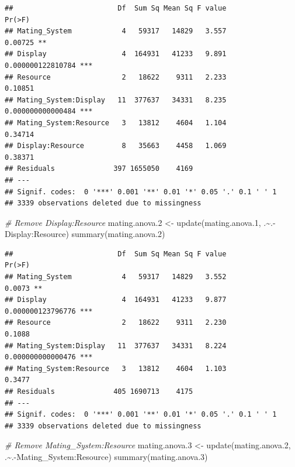 \documentclass[
  12pt,
]{article}
\newenvironment{Shaded}{\begin{snugshade}}{\end{snugshade}}
\newcommand{\CommentTok}[1]{\textcolor[rgb]{0.56,0.35,0.01}{\textit{#1}}}
\newcommand{\FloatTok}[1]{\textcolor[rgb]{0.00,0.00,0.81}{#1}}
\newcommand{\FunctionTok}[1]{\textcolor[rgb]{0.00,0.00,0.00}{#1}}
\newcommand{\NormalTok}[1]{#1}
\newcommand{\OtherTok}[1]{\textcolor[rgb]{0.56,0.35,0.01}{#1}}
\newcommand{\SpecialCharTok}[1]{\textcolor[rgb]{0.00,0.00,0.00}{#1}}
\begin{document}
\begin{verbatim}
##                         Df  Sum Sq Mean Sq F value            Pr(>F)    
## Mating_System            4   59317   14829   3.557           0.00725 ** 
## Display                  4  164931   41233   9.891 0.000000122810784 ***
## Resource                 2   18622    9311   2.233           0.10851    
## Mating_System:Display   11  377637   34331   8.235 0.000000000000484 ***
## Mating_System:Resource   3   13812    4604   1.104           0.34714    
## Display:Resource         8   35663    4458   1.069           0.38371    
## Residuals              397 1655050    4169                              
## ---
## Signif. codes:  0 '***' 0.001 '**' 0.01 '*' 0.05 '.' 0.1 ' ' 1
## 3339 observations deleted due to missingness
\end{verbatim}

\begin{Shaded}
\begin{Highlighting}[]
\CommentTok{\# Remove Display:Resource}
\NormalTok{mating.anova}\FloatTok{.2} \OtherTok{\textless{}{-}} \FunctionTok{update}\NormalTok{(mating.anova}\FloatTok{.1}\NormalTok{, .}\SpecialCharTok{\textasciitilde{}}\NormalTok{.}\SpecialCharTok{{-}}\NormalTok{Display}\SpecialCharTok{:}\NormalTok{Resource) }
\FunctionTok{summary}\NormalTok{(mating.anova}\FloatTok{.2}\NormalTok{)}
\end{Highlighting}
\end{Shaded}

\begin{verbatim}
##                         Df  Sum Sq Mean Sq F value            Pr(>F)    
## Mating_System            4   59317   14829   3.552            0.0073 ** 
## Display                  4  164931   41233   9.877 0.000000123796776 ***
## Resource                 2   18622    9311   2.230            0.1088    
## Mating_System:Display   11  377637   34331   8.224 0.000000000000476 ***
## Mating_System:Resource   3   13812    4604   1.103            0.3477    
## Residuals              405 1690713    4175                              
## ---
## Signif. codes:  0 '***' 0.001 '**' 0.01 '*' 0.05 '.' 0.1 ' ' 1
## 3339 observations deleted due to missingness
\end{verbatim}

\begin{Shaded}
\begin{Highlighting}[]
\CommentTok{\# Remove Mating\_System:Resource}
\NormalTok{mating.anova}\FloatTok{.3} \OtherTok{\textless{}{-}} \FunctionTok{update}\NormalTok{(mating.anova}\FloatTok{.2}\NormalTok{, .}\SpecialCharTok{\textasciitilde{}}\NormalTok{.}\SpecialCharTok{{-}}\NormalTok{Mating\_System}\SpecialCharTok{:}\NormalTok{Resource) }
\FunctionTok{summary}\NormalTok{(mating.anova}\FloatTok{.3}\NormalTok{)}
\end{Highlighting}
\end{Shaded}
\end{document}
